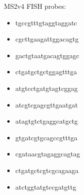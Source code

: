 MS2v4 FISH probes:
\begin{itemize}
    \itemsep-0.5em
    \item tgccgtttgtaggtaggatc
    \item cgcttgaagattggacagtg
    \item gactgtaatgacagtggagc
    \item ctgatgctgctggagtttga
    \item atgtcctgatgtagtcggag
    \item atcgtcgagcgttgaatgat
    \item atagtgtctgaggcatgctg
    \item gtgatcgtgcagccgtttga
    \item cgataacgtagaggcagtag
    \item ctgatgctcgtcgcagaaga
    \item atctggtatgtccgatgttg
\end{itemize}


